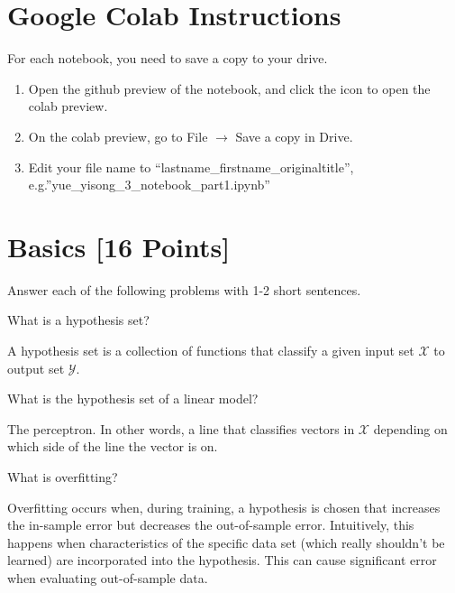 \section*{Google Colab Instructions}

For each notebook, you need to save a copy to your drive.

\begin{enumerate}
	\item Open the github preview of the notebook, and click the icon to open the colab preview.
	\item On the colab preview, go to File $\rightarrow$ Save a copy in Drive.
	\item Edit your file name to “lastname_firstname_originaltitle”, e.g.”yue_yisong_3_notebook_part1.ipynb”
\end{enumerate}


\newpage
\section{Basics [16 Points]}

Answer each of the following problems with 1-2 short sentences.

\begin{problem}[2]
  What is a hypothesis set?
\end{problem}
\begin{solution}
A hypothesis set is a collection of functions that classify a given input set $\mathcal{X}$ to output set $\mathcal{Y}$.
\end{solution}

\begin{problem}[2]
  What is the hypothesis set of a linear model?
\end{problem}
\begin{solution}
  The perceptron. In other words, a line that classifies vectors in $\mathcal{X}$ depending on which side of the line the vector is on.
\end{solution}

\begin{problem}[2]
  What is overfitting?
\end{problem}
\begin{solution}
  Overfitting occurs when, during training, a hypothesis is chosen that increases the in-sample error but decreases the out-of-sample error. Intuitively, this happens when characteristics of the specific data set (which really shouldn't be learned) are incorporated into the hypothesis. This can cause significant error when evaluating out-of-sample data.
\end{solution}

